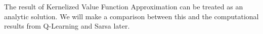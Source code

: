 The result of Kernelized Value Function Approximation can be treated as an analytic solution. We will make a comparison between this and the computational results from Q-Learning and Sarsa later.











